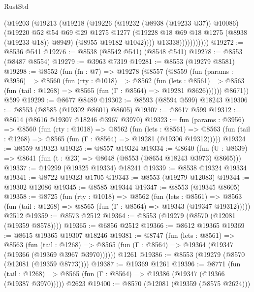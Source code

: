 \begin{lexlean}{RustStd}
\begin{coremodule}
                      (@19203
                        (@19213
                          (@19218
                            (@19226
                              (@19232 (@8938 (@19233 @37)) @10086)
                              (@19220
                                @52
                                @54
                                @69
                                @29
                                @1275
                                @1277
                                (@19228 @18 @69 @18 @1275 (@8938 (@19233 @18)) @8949)
                                (@8955 @19182 @1042))))
                          @13338)))))))))))
@19272 := @8536 @541
@19276 := @8538 (@8542 @541) (@8548 @541)
@19278 := @8553 (@8487 @8554)
@19279 := @3963 @7319
@19281 := @8553 (@19279 @8581)
@19298 := @8552
    (fun (fn : @7) =>
    @19278
      (@8557
        (@8559
          (fun (params : @3956) =>
          @8560
            (fun (rty : @1018) =>
            @8562
              (fun (lets : @8561) =>
              @8563 (fun (tail : @1268) => @8565 (fun (Γ : @8564) => @19281 @8626))))))
        @8671))
    @599
@19299 := @8677 @8489
@19302 := @8593 (@8594 @599) @18243
@19306 := @8553 (@8585 (@19302 @8601) @8605)
@19307 := @8617 @599
@19312 := @8614 (@8616 @19307 @18246 @3967 @3970)
@19323 := fun (params : @3956) =>
  @8560
    (fun (rty : @1018) =>
    @8562
      (fun (lets : @8561) =>
      @8563 (fun (tail : @1268) => @8565 (fun (Γ : @8564) => @19281 (@19306 @19312)))))
@19324 := @8559 @19323
@19325 := @8557 @19324
@19334 := @8640
    (fun (U : @8639) => @8641 (fun (t : @23) => @8648 (@8553 (@8654 @18243 @3973) @8665)))
@19337 := @19299 (@19325 @19334) @18241
@19339 := @8538 @19324 @19334
@19341 := @8722 @19323 @1705
@19343 := @8553 (@19279 @12083)
@19344 := @19302 @12086
@19345 := @8585 @19344
@19347 := @8553 (@19345 @8605)
@19358 := @8725
    (fun (rty : @1018) =>
    @8562
      (fun (lets : @8561) =>
      @8563 (fun (tail : @1268) => @8565 (fun (Γ : @8564) => @19343 (@19347 @19312)))))
    @2512
@19359 := @8573 @2512
@19364 := @8553 (@19279 (@8570 (@12081 (@19359 @8578))))
@19365 := @6856 @2512
@19366 := @8612 @19365
@19369 := @8615 @19365 @19307 @18246
@19381 := @8747
    (fun (lets : @8561) =>
    @8563
      (fun (tail : @1268) =>
      @8565 (fun (Γ : @8564) => @19364 (@19347 (@19366 (@19369 @3967 @3970))))))
    @1261
@19386 := @8553 (@19279 (@8570 (@12081 (@19359 @8773))))
@19387 := @19369 @1261
@19396 := @8771
    (fun (tail : @1268) => @8565 (fun (Γ : @8564) => @19386 (@19347 (@19366 (@19387 @3970)))))
    @2623
@19400 := @8570 (@12081 (@19359 (@8575 @2624)))

\end{coremodule}
\end{lexlean}
